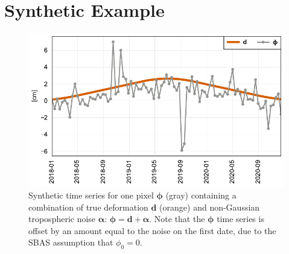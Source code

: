 %


\section{Synthetic Example}

\begin{figure}[!h]
	\centering
	\includegraphics[width=.75\textwidth]{figures/chapter5-lowess/figure2-demo-data-ts-only.pdf}
	\caption[Synthetic data for LOWESS smoothing]{
		Synthetic time series for one pixel $ \bm{\phi} $ (gray) containing a combination of true deformation $\bm{d}$ (orange) and non-Gaussian tropospheric noise $ \bm{\alpha} $: $\bm{\phi} =\bm{d} + \bm{\alpha}$. 
		Note that the $ \bm{\phi} $ time series is offset by an amount equal to the noise on the first date, due to the SBAS assumption that $ \phi_0 = 0 $.
	}
	\label{fig:ch5-demo-data}
\end{figure}


